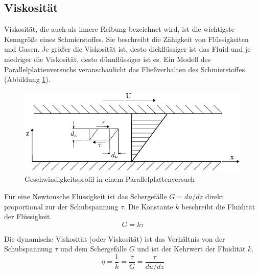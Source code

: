 \subsection*{Viskosität}
\label{sub:viskositaet}
Viskosität, die auch als innere Reibung bezeichnet wird, ist die wichtigste Kenngröße eines Schmierstoffes.
Sie beschreibt die Zähigkeit von Flüssigkeiten und Gasen.
Je größer die Viskosität ist, desto dickflüssiger ist das Fluid und je niedriger die Viskosität, desto dünnflüssiger ist es.
Ein Modell des Parallelplattenversuchs veranschaulicht das Fließverhalten des Schmierstoffes (Abbildung \ref{fig:geschwindigkeitsprofil_parallelplattenversuch}).
\begin{figure}[htb]
    \centering
    \includegraphics[]{./images/parallelplattenversuch.pdf}
    \caption{Geschwindigkeitsprofil in einem Parallelplattenversuch\cite{wisniewski}}
    \label{fig:geschwindigkeitsprofil_parallelplattenversuch}
\end{figure}

Für eine Newtonsche Flüssigkeit ist das Schergefälle $G = du/dz$ direkt proportional zur der Schubspannung $\tau$.
Die Konstante $k$ beschreibt die Fluidität der Flüssigkeit.
\begin{equation}
    G = k  \tau
    \label{eq:schergefaelle}
\end{equation}

Die dynamische Viskosität (oder Viskosität) ist das Verhältnis von der Schubspannung $\tau$ und dem Schergefälle $G$ und ist der Kehrwert der Fluidität $k$.
\begin{equation}
    \eta = \frac{1}{k} = \frac{\tau}{G} = \frac{\tau}{du/dz}
    \label{eq:dynamische_viskositaet}
\end{equation}

